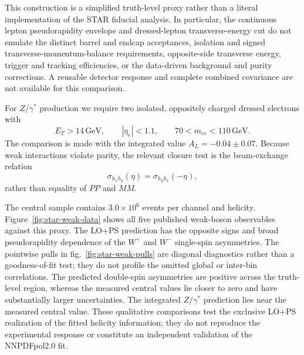 \documentclass[11pt,a4paper]{article}
\newcommand{\GeV}{\ensuremath{\,\mathrm{GeV}}}
\begin{document}
This construction is a simplified truth-level proxy rather than a literal
implementation of the STAR fiducial analysis.  In particular, the continuous
lepton pseudorapidity envelope and dressed-lepton transverse-energy cut do not
emulate the distinct barrel and endcap acceptances, isolation and signed
transverse-momentum-balance requirements, opposite-side transverse energy,
trigger and tracking efficiencies, or the data-driven background and purity
corrections.  A reusable detector response and complete combined covariance
are not available for this comparison.

For $Z/\gamma^*$ production we require two isolated, oppositely charged
dressed electrons with
\begin{equation}
 E_T>14\GeV,\qquad |\eta_e|<1.1,\qquad
 70<m_{ee}<110\GeV .
\end{equation}
The comparison is made with the integrated value
$A_L=-0.04\pm0.07$.  Because weak interactions violate parity, the relevant
closure test is the beam-exchange relation
\begin{equation}
 \sigma_{h_1h_2}(\eta)=\sigma_{h_2h_1}(-\eta),
 \label{eq:beam-exchange}
\end{equation}
rather than equality of $PP$ and $MM$.

The central sample contains $3.0\times10^6$ events per channel and helicity.
Figure~\ref{fig:star-weak-data} shows all five published weak-boson
observables against this proxy.  The LO+PS prediction has the opposite signs
and broad pseudorapidity dependence of the $W^+$ and $W^-$ single-spin
asymmetries.  The pointwise pulls in fig.~\ref{fig:star-weak-pulls} are
diagonal diagnostics rather than a goodness-of-fit test; they do not profile
the omitted global or inter-bin correlations.  The predicted double-spin
asymmetries are positive across the truth-level region, whereas the measured
central values lie closer to zero and have substantially larger
uncertainties.  The integrated $Z/\gamma^*$ prediction lies near the measured
central value.  These qualitative comparisons test the exclusive LO+PS
realization of the fitted helicity information; they do not reproduce the
experimental response or constitute an independent validation of the
NNPDFpol2.0 fit.
\end{document}

